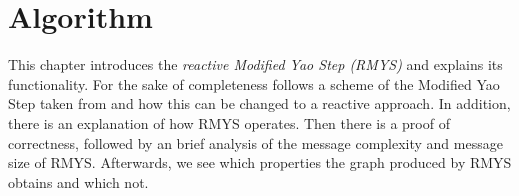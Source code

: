 %
%
\section{Algorithm}
This chapter introduces the \emph{reactive Modified Yao Step (RMYS)} and explains its functionality.
For the sake of completeness follows a scheme of the Modified Yao Step taken from \cite{kanj} and how this can be changed to a reactive approach.
In addition, there is an explanation of how RMYS operates.
Then there is a proof of correctness, followed by an brief analysis of the message complexity and message size of RMYS.
Afterwards, we see which properties the graph produced by RMYS obtains and which not.

